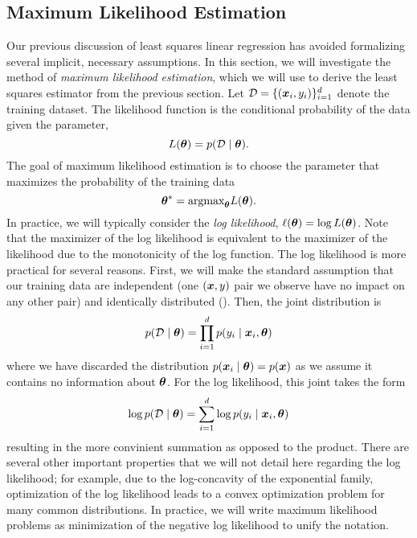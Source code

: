 

\subsection{Maximum Likelihood Estimation}

Our previous discussion of least squares linear regression has avoided formalizing several implicit, necessary assumptions. In this section, we will investigate the method of \textit{maximum likelihood estimation}, which we will use to derive the least squares estimator from the previous section. Let $\mathcal{D} = \{(\bm{x}_i, y_i)\}_{i = 1}^{d}$ denote the training dataset. The likelihood function is the conditional probability of the data given the parameter,
\begin{equation}
L(\bm{\theta}) = p(\mathcal{D}\mid \bm{\theta}).
\end{equation}
The goal of maximum likelihood estimation is to choose the parameter that maximizes the probability of the training data
\begin{equation}
    \bm{\theta}^* = \text{argmax}_{\bm{\theta}} L(\bm{\theta}).
\end{equation}
In practice, we will typically consider the \textit{log likelihood}, $\ell(\bm{\theta}) = \log L(\bm{\theta})$. Note that the maximizer of the log likelihood is equivalent to the maximizer of the likelihood due to the monotonicity of the log function. The log likelihood is more practical for several reasons. First, we will make the standard assumption that our training data are independent (one $(\bm{x}, y)$ pair we observe have no impact on any other pair) and identically distributed (\iid). Then, the joint distribution is
\begin{equation}
    p(\mathcal{D}\mid \bm{\theta}) = \prod_{i=1}^{d} p(y_i \mid \bm{x}_i, \bm{\theta})
\end{equation}
where we have discarded the distribution $p(\bm{x}_i \mid \bm{\theta}) = p(\bm{x})$ as we assume it contains no information about $\bm{\theta}$. For the log likelihood, this joint takes the form 
\begin{equation}
    \log p(\mathcal{D}\mid \bm{\theta}) = \sum_{i=1}^{d} \log p(y_i \mid \bm{x}_i, \bm{\theta})
\end{equation}
resulting in the more convinient summation as opposed to the product. There are several other important properties that we will not detail here regarding the log likelihood; for example, due to the log-concavity of the exponential family, optimization of the log likelihood leads to a convex optimization problem for many common distributions. In practice, we will write maximum likelihood problems as minimization of the negative log likelihood to unify the notation. 

